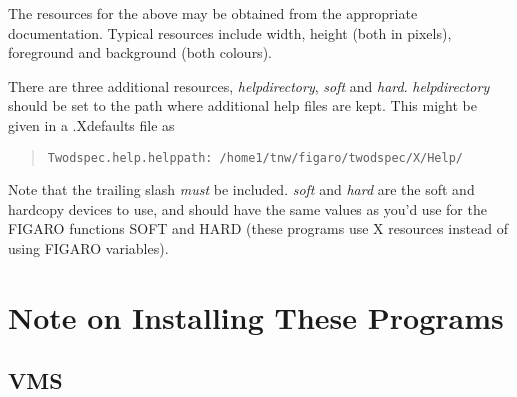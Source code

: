 The resources for the above may be obtained from the appropriate documentation.
Typical resources include width, height (both in pixels), foreground and
background (both colours).

There are three additional resources, {\it helpdirectory}, {\it soft}
and {\it hard}.
{\it helpdirectory} should be set to the path where additional help
files are kept.
This might be given in a .Xdefaults file as
\begin{quote}\begin{verbatim}
Twodspec.help.helppath: /home1/tnw/figaro/twodspec/X/Help/
\end{verbatim}\end{quote}
Note that the trailing slash {\em must} be included.
{\it soft} and {\it hard} are the soft and hardcopy devices to use,
and should have the same values as you'd use for the FIGARO functions
SOFT and HARD (these programs use X resources instead of using
FIGARO variables).

\section{Note on Installing These Programs}
\label{append.install}

\subsection{VMS}

